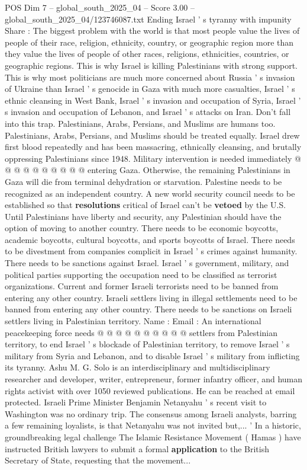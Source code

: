 \begin{textsample}{POS Dim 7 – global\_south\_2025\_04 – Score 3.00 – global\_south\_2025\_04/123746087.txt}  \label{ex:f7_pos_140}
Ending Israel ' s tyranny with impunity Share : The biggest problem with the world is that most people value the lives of people of their race, religion, ethnicity, country, or geographic region more than they value the lives of people of other races, religions, ethnicities, countries, or geographic regions.
This is why Israel is killing Palestinians with strong support.
This is why most politicians are much more concerned about Russia ' s invasion of Ukraine than Israel ' s genocide in Gaza with much more casualties, Israel ' s ethnic cleansing in West Bank, Israel ' s invasion and occupation of Syria, Israel ' s invasion and occupation of Lebanon, and Israel ' s attacks on Iran.
Don't fall into this trap.
Palestinians, Arabs, Persians, and Muslims are humans too.
Palestinians, Arabs, Persians, and Muslims should be treated equally.
Israel drew first blood repeatedly and has been massacring, ethnically cleansing, and brutally oppressing Palestinians since 1948.
Military intervention is needed immediately @ @ @ @ @ @ @ @ @ @ entering Gaza.
Otherwise, the remaining Palestinians in Gaza will die from terminal dehydration or starvation.
Palestine needs to be recognized as an independent country.
A new world security council needs to be established so that \textbf{resolutions} critical of Israel can't be \textbf{vetoed} by the U.S.
Until Palestinians have liberty and security, any Palestinian should have the option of moving to another country.
There needs to be economic boycotts, academic boycotts, cultural boycotts, and sports boycotts of Israel.
There needs to be divestment from companies complicit in Israel ' s crimes against humanity.
There needs to be sanctions against Israel.
Israel ' s government, military, and political parties supporting the occupation need to be classified as terrorist organizations.
Current and former Israeli terrorists need to be banned from entering any other country.
Israeli settlers living in illegal settlements need to be banned from entering any other country.
There needs to be sanctions on Israeli settlers living in Palestinian territory.
Name : Email : An international peacekeeping force needs @ @ @ @ @ @ @ @ @ @ settlers from Palestinian territory, to end Israel ' s blockade of Palestinian territory, to remove Israel ' s military from Syria and Lebanon, and to disable Israel ' s military from inflicting its tyranny.
Ashu M.
G.
Solo is an interdisciplinary and multidisciplinary researcher and developer, writer, entrepreneur, former infantry officer, and human rights activist with over 1050 reviewed publications.
He can be reached at email protected.
Israeli Prime Minister Benjamin Netanyahu ' s recent visit to Washington was no ordinary trip.
The consensus among Israeli analysts, barring a few remaining loyalists, is that Netanyahu was not invited but,... ' In a historic, groundbreaking legal challenge The Islamic Resistance Movement ( Hamas ) have instructed British lawyers to submit a formal \textbf{application} to the British Secretary of State, requesting that the movement...

\end{textsample}
